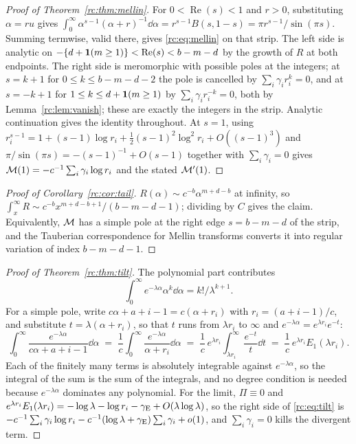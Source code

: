 \begin{proof}[Proof of Theorem~\ref{rc:thm:mellin}]
For $0<\operatorname{Re}(s)<1$ and $r>0$, substituting $\alpha=ru$ gives $\int_0^\infty\alpha^{s-1}(\alpha+r)^{-1}\dd\alpha=r^{s-1}B(s,1-s)=\pi r^{s-1}/\sin(\pi s)$. Summing termwise, valid there, gives \eqref{rc:eq:mellin} on that strip. The left side is analytic on $-\{d+\mathbf{1}(m\ge1)\}<\operatorname{Re}(s)<b-m-d$ by the growth of $R$ at both endpoints. The right side is meromorphic with possible poles at the integers; at $s=k+1$ for $0\le k\le b-m-d-2$ the pole is cancelled by $\sum_i\gamma_ir_i^k=0$, and at $s=-k+1$ for $1\le k\le d+\mathbf{1}(m\ge1)$ by $\sum_i\gamma_ir_i^{-k}=0$, both by Lemma~\ref{rc:lem:vanish}; these are exactly the integers in the strip. Analytic continuation gives the identity throughout. At $s=1$, using $r_i^{s-1}=1+(s-1)\log r_i+\frac12(s-1)^2\log^2r_i+O((s-1)^3)$ and $\pi/\sin(\pi s)=-(s-1)^{-1}+O(s-1)$ together with $\sum_i\gamma_i=0$ gives $\mathcal{M}(1)=-c^{-1}\sum_i\gamma_i\log r_i$ and the stated $\mathcal{M}'(1)$.
\end{proof}

\begin{proof}[Proof of Corollary~\ref{rc:cor:tail}]
$R(\alpha)\sim c^{-b}\alpha^{m+d-b}$ at infinity, so $\int_x^\infty R\sim c^{-b}x^{m+d-b+1}/(b-m-d-1)$; dividing by $C$ gives the claim. Equivalently, $\mathcal{M}$ has a simple pole at the right edge $s=b-m-d$ of the strip, and the Tauberian correspondence for Mellin transforms converts it into regular variation of index $b-m-d-1$.
\end{proof}

\begin{proof}[Proof of Theorem~\ref{rc:thm:tilt}]
The polynomial part contributes
\[
\int_0^\infty e^{-\lambda\alpha}\alpha^k\dd\alpha=k!/\lambda^{k+1}.
\]
For a simple pole, write $c\alpha+a+i-1=c(\alpha+r_i)$ with $r_i=(a+i-1)/c$, and substitute $t=\lambda(\alpha+r_i)$, so that $t$ runs from $\lambda r_i$ to $\infty$ and $e^{-\lambda\alpha}=e^{\lambda r_i}e^{-t}$:
\[
\int_0^\infty\frac{e^{-\lambda\alpha}}{c\alpha+a+i-1}\dd\alpha\;=\;\frac1c\int_0^\infty\frac{e^{-\lambda\alpha}}{\alpha+r_i}\dd\alpha\;=\;\frac1c\,e^{\lambda r_i}\int_{\lambda r_i}^\infty\frac{e^{-t}}{t}\dd t\;=\;\frac1c\,e^{\lambda r_i}E_1(\lambda r_i).
\]
Each of the finitely many terms is absolutely integrable against $e^{-\lambda\alpha}$, so the integral of the sum is the sum of the integrals, and no degree condition is needed because $e^{-\lambda\alpha}$ dominates any polynomial. For the limit, $\Pi\equiv0$ and $e^{\lambda r_i}E_1(\lambda r_i)=-\log\lambda-\log r_i-\gamma_{\mathrm{E}}+O(\lambda\log\lambda)$, so the right side of \eqref{rc:eq:tilt} is $-c^{-1}\sum_i\gamma_i\log r_i-c^{-1}(\log\lambda+\gamma_{\mathrm{E}})\sum_i\gamma_i+o(1)$, and $\sum_i\gamma_i=0$ kills the divergent term.
\end{proof}

